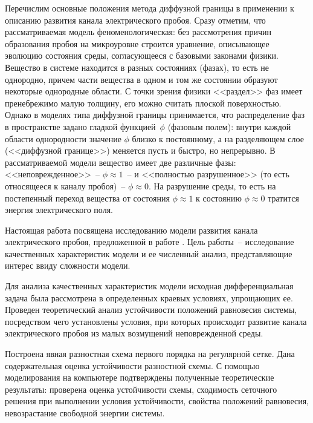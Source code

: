 Перечислим основные положения метода диффузной границы в применении к описанию развития канала электрического пробоя. Сразу отметим, что рассматриваемая модель феноменологическая: без рассмотрения причин образования пробоя на микроуровне строится уравнение, описывающее эволюцию состояния среды, согласующееся с базовыми законами физики. Вещество в системе находится в разных состояниях (фазах), то есть не однородно, причем части вещества в одном и том же состоянии образуют некоторые однородные области. С точки зрения физики <<раздел>> фаз имеет пренебрежимо малую толщину, его можно считать плоской поверхностью. Однако в моделях типа диффузной границы принимается, что распределение фаз в пространстве задано гладкой функцией~$\phi$ (фазовым полем): внутри каждой области однородности значение $\phi$ близко к постоянному, а на разделяющем слое (<<диффузной границе>>) меняется пусть и быстро, но непрерывно. В рассматриваемой модели вещество имеет две различные фазы: <<неповрежденное>>~-- $\phi \approx 1$~-- и <<полностью разрушенное>> (то есть относящееся к каналу пробоя)~-- $\phi \approx 0$. На разрушение среды, то есть на постепенный переход вещества от состояния $\phi \approx 1$ к состоянию $\phi \approx 0$ тратится энергия электрического поля.

Настоящая работа посвящена исследованию модели развития канала электрического пробоя, предложенной в работе \cite{pitike_dielectric_breakdown}. Цель работы~-- исследование качественных характеристик модели и ее численный анализ, представляющие интерес ввиду сложности модели.

Для анализа качественных характеристик модели исходная дифференциальная задача была рассмотрена в определенных краевых условиях, упрощающих ее. Проведен теоретический анализ устойчивости положений равновесия системы, посредством чего установлены условия, при которых происходит развитие канала электрического пробоя из малых возмущений неповрежденной среды.

Построена явная разностная схема первого порядка на регулярной сетке. Дана содержательная оценка устойчивости разностной схемы. С помощью моделирования на компьютере подтверждены полученные теоретические результаты: проверена оценка устойчивости схемы, сходимость сеточного решения при выполнении условия устойчивости, свойства положений равновесия, невозрастание свободной энергии системы.